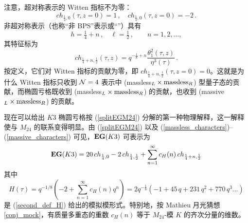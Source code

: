 \documentclass[11pt,a4paper,fontset=windows]{ctexart}
\numberwithin{equation}{section}
\def\m{\mu}
\def\t{\tau}
\def\th{\theta}
\newcommand{\be}{\begin{equation}}
\newcommand{\ee}{\end{equation}}
\newcommand{\eq}[1]{(\ref{#1})}
\begin{document}

注意，超对称表示的 Witten 指标不为零：
$$ch_{\frac{1}{4},0}(\t,z=0) =1\,, \quad ch_{\frac{1}{4},0}(\t,z=0) =-2\,.$$ 
非超对称表示（也称“非 BPS”表示或“”）具有
$$
h =\tfrac{1}{4} + n\, ,\quad \ell =\tfrac{1}{2}\, ,\quad\text{} \quad n = 1,2,\dots,
$$
其特征标为
\be\label{massive_characters}
ch_{\frac{1}{4}+n,\frac{1}{2}}(\t,z) = q^{-\frac{1}{8}+n} \frac{\th_1^2(\t,z)}{\eta^3(\t)} \, .
\ee
按定义，它们对 Witten 指标的贡献为零，即 $ch_{\frac{1}{4}+n,\frac{1}{2}}(\t,z=0) = 0$。这就是为什么 Witten 指标只收到 ${\cal N}=4$ 表示中 (massless$_L\times{\rm massless}_R$) 型量子态的贡献，而椭圆亏格既收到 (massless$_L\times{\rm massless}_R$) 的贡献，也收到 (massive$_L\times{\rm massless}_R$) 的贡献。

现在可以给出 $K3$ 椭圆亏格按 (\ref{splitEGM24}) 分解的第一种物理解释，这一解释使与 $M_{24}$ 的联系变得明显。由 (\ref{splitEGM24}) 以及 \eq{massless_characters}--\eq{massive_characters} 可见，${\bf EG}(K3)$ 可表示为
\be
{\bf EG}(K3) =  20\, ch_{\frac{1}{4},0} -2 \, ch_{\frac{1}{4},{1\over 2}}  + \sum_{n=1}^\infty c_H(n)\,ch_{\frac{1}{4}+n,\frac{1}{2}}
\ee
其中
\be 
H(\t) =q^{-1/8}\left(-2 +\sum_{n=1}^\infty c_H(n)q^n\right) =2 q^{-\frac{1}{8}} \left( -1 + 45\, q+ 231\, q^2 + 770\,q^3\dots \right)
\ee
是 \eq{second_def_H} 给出的模拟模形式。特别地，按 Mathieu 月光猜想 \ref{conj_mock}，有质量多重态的重数 $c_H(n)$ 等于 $M_{24}$-模 $K$ 的齐次分量的维数。

\end{document}
